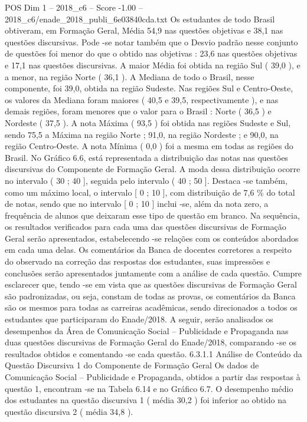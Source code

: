 \begin{textsample}{POS Dim 1 – 2018\_c6 – Score -1.00 – 2018\_c6/enade\_2018\_publi\_6e03840cda.txt}
Os estudantes de todo Brasil obtiveram, em Formação Geral, Média 54,9 nas questões objetivas e 38,1 nas questões discursivas.
Pode -se notar também que o Desvio padrão nesse conjunto de questões foi menor do que o obtido nas objetivas : 23,6 nas questões objetivas e 17,1 nas questões discursivas.
A maior Média foi obtida na região Sul ( 39,0 ), e a menor, na região Norte ( 36,1 ).
A Mediana de todo o Brasil, nesse componente, foi 39,0, obtida na região Sudeste.
Nas regiões Sul e Centro-Oeste, os valores da Mediana foram maiores ( 40,5 e 39,5, respectivamente ), e nas demais regiões, foram menores que o valor para o Brasil : Norte ( 36,5 ) e Nordeste ( 37,5 ).
A nota Máxima ( 93,5 ) foi obtida nas regiões Sudeste e Sul, sendo 75,5 a Máxima na região Norte ; 91,0, na região Nordeste ; e 90,0, na região Centro-Oeste.
A nota Mínima ( 0,0 ) foi a mesma em todas as regiões do Brasil.
No Gráfico 6.6, está representada a distribuição das notas nas questões discursivas do Componente de Formação Geral.
A moda dessa distribuição ocorre no intervalo ( 30 ; 40 ], seguida pelo intervalo ( 40 ; 50 ].
Destaca -se também, como um máximo local, o intervalo [ 0 ; 10 ], com distribuição de 7,6 \% do total de notas, sendo que no intervalo [ 0 ; 10 ] inclui -se, além da nota zero, a frequência de alunos que deixaram esse tipo de questão em branco.
Na sequência, os resultados verificados para cada uma das questões discursivas de Formação Geral serão apresentados, estabelecendo -se relações com os conteúdos abordados em cada uma delas.
Os comentários da Banca de docentes corretores a respeito do observado na correção das respostas dos estudantes, suas impressões e conclusões serão apresentados juntamente com a análise de cada questão.
Cumpre esclarecer que, tendo -se em vista que as questões discursivas de Formação Geral são padronizadas, ou seja, constam de todas as provas, os comentários da Banca são os mesmos para todas as carreiras acadêmicas, sendo direcionados a todos os estudantes que participaram do Enade/2018.
A seguir, serão analisados os desempenhos da Área de Comunicação Social – Publicidade e Propaganda nas duas questões discursivas de Formação Geral do Enade/2018, comparando -se os resultados obtidos e comentando -se cada questão. 6.3.1.1 Análise de Conteúdo da Questão Discursiva 1 do Componente de Formação Geral Os dados de Comunicação Social – Publicidade e Propaganda, obtidos a partir das respostas à questão 1, encontram -se na Tabela 6.14 e no Gráfico 6.7.
O desempenho médio dos estudantes na questão discursiva 1 ( média 30,2 ) foi inferior ao obtido na questão discursiva 2 ( média 34,8 ).

\end{textsample}
